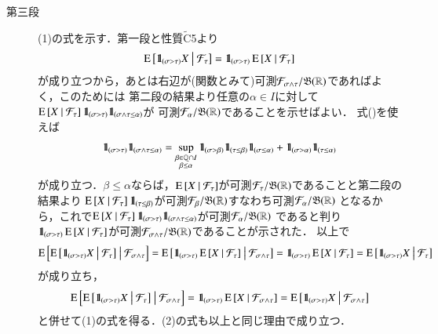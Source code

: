 \begin{prf}
\begin{description}
			\item[第三段]
				(1)の式を示す．第一段と性質$\tilde{\mathrm{C}}$5より
				\begin{align}
					\cexp{\defunc_{(\sigma > \tau)}X}{\mathcal{F}_\tau} = \defunc_{(\sigma > \tau)} \cexp{X}{\mathcal{F}_\tau}
				\end{align}
				が成り立つから，あとは右辺が(関数とみて)可測$\mathcal{F}_{\sigma \wedge \tau}/\borel{\R}$であればよく，このためには
				第二段の結果より任意の$\alpha \in I$に対して$\cexp{X}{\mathcal{F}_\tau}\defunc_{(\sigma > \tau)}\defunc_{(\sigma \wedge \tau \leq \alpha)}$が
				可測$\mathcal{F}_\alpha/\borel{\R}$であることを示せばよい．
				式()を使えば
				\begin{align}
					\defunc_{(\sigma > \tau)}\defunc_{(\sigma \wedge \tau \leq \alpha)}
					= \sup{\substack{\beta \in \Q \cap I \\ \beta \leq \alpha}}{\defunc_{(\sigma > \beta)}\defunc_{(\tau \leq \beta)}\defunc_{(\sigma \leq \alpha)}}
						+ \defunc_{(\sigma > \alpha)} \defunc_{(\tau \leq \alpha)}
				\end{align}
				が成り立つ．$\beta \leq \alpha$ならば，$\cexp{X}{\mathcal{F}_\tau}$が可測$\mathcal{F}_\tau/\borel{\R}$であることと第二段の結果より
				$\cexp{X}{\mathcal{F}_\tau}\defunc_{(\tau \leq \beta)}$が可測$\mathcal{F}_\beta/\borel{\R}$すなわち可測$\mathcal{F}_\alpha/\borel{\R}$
				となるから，これで$\cexp{X}{\mathcal{F}_\tau}\defunc_{(\sigma > \tau)}\defunc_{(\sigma \wedge \tau \leq \alpha)}$が可測$\mathcal{F}_\alpha/\borel{\R}$
				であると判り$\defunc_{(\sigma > \tau)} \cexp{X}{\mathcal{F}_\tau}$が可測$\mathcal{F}_{\sigma \wedge \tau}/\borel{\R}$であることが示された．
				以上で
				\begin{align}
					\cexp{\cexp{\defunc_{(\sigma > \tau)}X}{\mathcal{F}_\tau}}{\mathcal{F}_{\sigma \wedge \tau}}
					= \cexp{\defunc_{(\sigma > \tau)} \cexp{X}{\mathcal{F}_\tau}}{\mathcal{F}_{\sigma \wedge \tau}}
					= \defunc_{(\sigma > \tau)} \cexp{X}{\mathcal{F}_\tau}
					= \cexp{\defunc_{(\sigma > \tau)}X}{\mathcal{F}_\tau}
				\end{align}
				が成り立ち，
				\begin{align}
					\cexp{\cexp{\defunc_{(\sigma > \tau)}X}{\mathcal{F}_\tau}}{\mathcal{F}_{\sigma \wedge \tau}}
					= \defunc_{(\sigma > \tau)} \cexp{X}{\mathcal{F}_{\sigma \wedge \tau}}
					= \cexp{\defunc_{(\sigma > \tau)}X}{\mathcal{F}_{\sigma \wedge \tau}}
				\end{align}
				と併せて(1)の式を得る．(2)の式も以上と同じ理由で成り立つ．
				

\end{description}
\end{prf}
